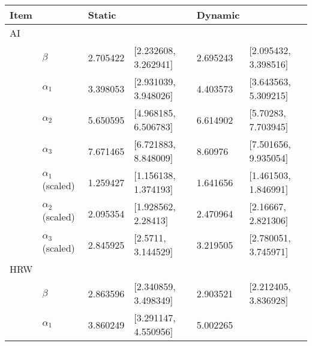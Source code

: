 \documentclass[12pt,letterpaper,leqno]{article}\usepackage[]{graphicx}\usepackage[]{color}
\begin{document}
\begin{table}[!h]
\begin{tabular}{p{.5cm}p{2cm}p{1.5cm}p{4cm}p{1.5cm}p{4cm}}
\hline
Item &  & Static  & & Dynamic  & \\
\hline 
AI & & & & & \\ 
 & $\beta$               & 2.705422 
                         & [2.232608, 
                         3.262941] 
                         & 2.695243 
                         & [2.095432, 
                         3.398516]\\
 & $\alpha_{1}$          & 3.398053 
                         & [2.931039, 
                         3.948026]
                         & 4.403573 
                         & [3.643563, 
                         5.309215]\\
 & $\alpha_{2}$          & 5.650595 
                         & [4.968185, 
                         6.506783]
                         & 6.614902 
                         & [5.70283, 
                         7.703945]\\
 & $\alpha_{3}$          & 7.671465 
                         & [6.721883, 
                         8.848009]
                         & 8.60976 
                         & [7.501656, 
                         9.935054]\\
 & $\alpha_{1}$ (scaled) & 1.259427 
                         & [1.156138, 
                         1.374193]
                         & 1.641656 
                         & [1.461503, 
                         1.846991]\\
 & $\alpha_{2}$ (scaled) & 2.095354 
                         & [1.928562, 
                         2.28413]
                         & 2.470964 
                         & [2.16667, 
                         2.821306]\\
 & $\alpha_{3}$ (scaled) & 2.845925 
                         & [2.5711, 
                         3.144529]
                         & 3.219505 
                         & [2.780051, 
                         3.745971]\\
HRW & & & & & \\ 
 & $\beta$               & 2.863596 
                         & [2.340859, 
                         3.498349] 
                         & 2.903521 
                         & [2.212405, 
                         3.836928]\\
 & $\alpha_{1}$          & 3.860249 
                         & [3.291147, 
                         4.550956]
                         & 5.002265 

\end{tabular}
\end{table}
\end{document}
